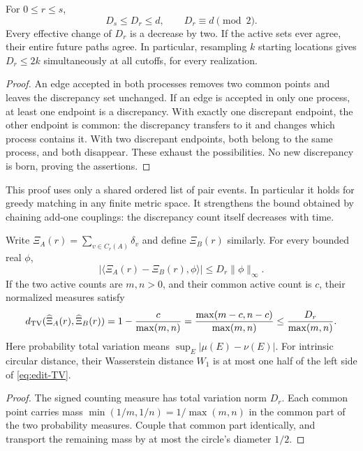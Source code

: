 \documentclass[11pt,letterpaper]{article}
\begin{document}
\begin{theorem}
\label{thm:edit-contraction}
For $0\le r\le s$,
\begin{equation}\label{eq:edit-contraction}
 D_s\le D_r\le d,\qquad D_r\equiv d\pmod2.
\end{equation}
Every effective change of $D_r$ is a decrease by two. If the active
sets ever agree, their entire future paths agree. In particular,
resampling $k$ starting locations gives $D_r\le2k$ simultaneously
at all cutoffs, for every realization.
\end{theorem}
\begin{proof}
An edge accepted in both processes removes two common points and
leaves the discrepancy set unchanged. If an edge is accepted in
only one process, at least one endpoint is a discrepancy. With
exactly one discrepant endpoint, the other endpoint is common:
the discrepancy transfers to it and changes which process contains
it. With two discrepant endpoints, both belong to the same process,
and both disappear. These exhaust the possibilities. No new
discrepancy is born, proving the assertions.
\end{proof}

This proof uses only a shared ordered list of pair events. In
particular it holds for greedy matching in any finite metric space.
It strengthens the bound obtained by chaining add-one couplings:
the discrepancy count itself decreases with time.

\begin{corollary}\label{cor:edit-measures}
Write $\Xi_A(r)=\sum_{v\in C_r(A)}\delta_v$ and define $\Xi_B(r)$ similarly.
For every bounded real $\phi$,
\[
 |\langle\Xi_A(r)-\Xi_B(r),\phi\rangle|
       \le D_r\|\phi\|_\infty.
\]
If the two active counts are $m,n>0$, and their common active count
is $c$, their normalized measures satisfy
\begin{equation}\label{eq:edit-TV}
 d_{\rm TV}(\widehat\Xi_A(r),\widehat\Xi_B(r))
 =1-\frac{c}{\max(m,n)}
 =\frac{\max(m-c,n-c)}{\max(m,n)}
 \le\frac{D_r}{\max(m,n)}.
\end{equation}
Here probability total variation means $\sup_E|\mu(E)-\nu(E)|$.
For intrinsic circular distance, their Wasserstein distance $W_1$
is at most one half of the left side of \eqref{eq:edit-TV}.
\end{corollary}
\begin{proof}
The signed counting measure has total variation norm $D_r$.
Each common point carries mass $\min(1/m,1/n)=1/\max(m,n)$ in
the common part of the two probability measures. Couple that
common part identically, and transport the remaining mass by at
most the circle's diameter $1/2$.
\end{proof}
\end{document}
